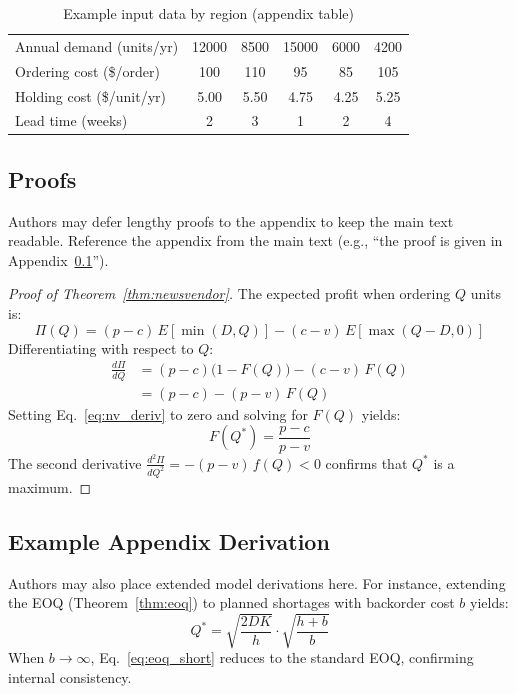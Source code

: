 \documentclass[preprint]{oscmjournal}
\begin{document}
\begin{table}[htbp]
\tablestyle[fontsize=8, linespacing=9, stretch=1.2, colsep=8pt]
\centering
\caption{Example input data by region (appendix table)}\label{tab:appdata}
\begin{tabular*}{\textwidth}{@{\extracolsep{\fill}}lSSSSS}
\toprule
{} & {} & {} & {} & {} & {} \\
\midrule
Annual demand (units/yr)       & 12000 & 8500  & 15000 & 6000 & 4200 \\
Ordering cost (\$/order)       & 100   & 110   & 95    & 85   & 105  \\
Holding cost (\$/unit/yr)      & 5.00  & 5.50  & 4.75  & 4.25 & 5.25 \\
Lead time (weeks)              & 2     & 3     & 1     & 2    & 4    \\
\bottomrule
\end{tabular*}
\end{table}

\subsection{Proofs}\label{app:proofs}

Authors may defer lengthy proofs to the appendix to keep the main text readable.
Reference the appendix from the main text (e.g., ``the proof is given in Appendix~\ref{app:proofs}'').

\begin{proof}[Proof of Theorem~\ref{thm:newsvendor}]
The expected profit when ordering $Q$ units is:
\begin{equation}
\Pi(Q) = (p - c)\,E[\min(D, Q)] - (c - v)\,E[\max(Q - D, 0)] \label{eq:nv_profit}
\end{equation}
Differentiating with respect to $Q$:
\begin{align}
\frac{d\Pi}{dQ} &= (p - c)\bigl(1 - F(Q)\bigr) - (c - v)\,F(Q) \nonumber \\
                &= (p - c) - (p - v)\,F(Q) \label{eq:nv_deriv}
\end{align}
Setting Eq.~\eqref{eq:nv_deriv} to zero and solving for $F(Q)$ yields:
\begin{equation}
F(Q^*) = \frac{p - c}{p - v} \label{eq:nv_solution}
\end{equation}
The second derivative $\frac{d^2\Pi}{dQ^2} = -(p-v)\,f(Q) < 0$ confirms that $Q^*$ is a maximum.
\end{proof}


\subsection{Example Appendix Derivation}

Authors may also place extended model derivations here.
For instance, extending the EOQ (Theorem~\ref{thm:eoq}) to planned shortages with backorder cost $b$ yields:
\begin{equation}
Q^* = \sqrt{\frac{2DK}{h}} \cdot \sqrt{\frac{h + b}{b}} \label{eq:eoq_short}
\end{equation}
When $b \to \infty$, Eq.~\eqref{eq:eoq_short} reduces to the standard EOQ, confirming internal consistency.
\end{document}
